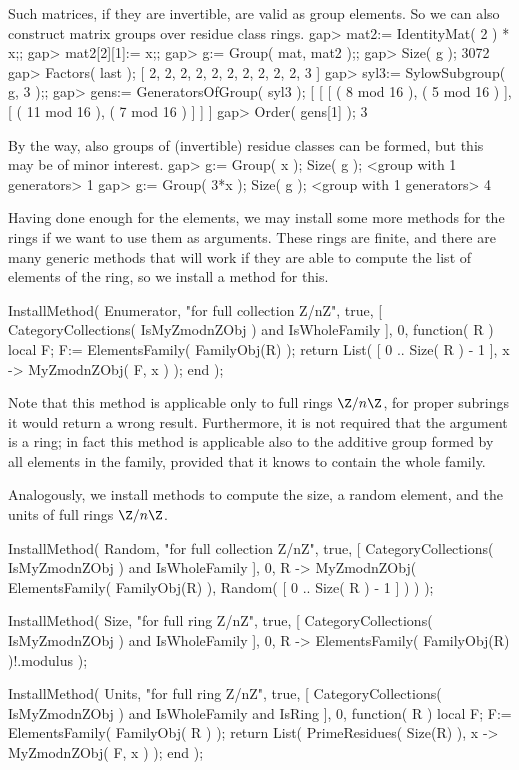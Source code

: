 Such matrices, if they are invertible, are valid as group elements.
So we can also construct matrix groups over residue class rings.
\begintt
gap> mat2:= IdentityMat( 2 ) * x;;
gap> mat2[2][1]:= x;;
gap> g:= Group( mat, mat2 );;
gap> Size( g );
3072
gap> Factors( last );
[ 2, 2, 2, 2, 2, 2, 2, 2, 2, 2, 3 ]
gap> syl3:= SylowSubgroup( g, 3 );;
gap> gens:= GeneratorsOfGroup( syl3 );
[ [ [ ( 8 mod 16 ), ( 5 mod 16 ) ], [ ( 11 mod 16 ), ( 7 mod 16 ) ] ] ]
gap> Order( gens[1] );
3
\endtt

By the way, also groups of (invertible) residue classes can be formed,
but this may be of minor interest.
\begintt
gap> g:= Group( x );  Size( g );
<group with 1 generators>
1
gap> g:= Group( 3*x );  Size( g );
<group with 1 generators>
4
\endtt

Having done enough for the elements,
we may install some more methods for the rings
if we want to use them as arguments.
These rings are finite,
and there are many generic methods that will work if they are able
to compute the list of elements of the ring,
so we install a method for this.

\begintt
InstallMethod( Enumerator,
    "for full collection Z/nZ",
    true,
    [ CategoryCollections( IsMyZmodnZObj ) and IsWholeFamily ], 0,
    function( R )
    local F;
    F:= ElementsFamily( FamilyObj(R) );
    return List( [ 0 .. Size( R ) - 1 ], x -> MyZmodnZObj( F, x ) );
    end );
\endtt

Note that this method is applicable only to full rings $\Z/n\Z$,
for proper subrings it would return a wrong result.
Furthermore, it is not required that the argument is a ring;
in fact this method is applicable also to the additive group
formed by all elements in the family,
provided that it knows to contain the whole family.

Analogously, we install methods to compute the size,
a random element, and the units of full rings $\Z/n\Z$.

\begintt
InstallMethod( Random,
    "for full collection Z/nZ",
    true,
    [ CategoryCollections( IsMyZmodnZObj ) and IsWholeFamily ], 0,
    R -> MyZmodnZObj( ElementsFamily( FamilyObj(R) ),
                    Random( [ 0 .. Size( R ) - 1 ] ) ) );

InstallMethod( Size,
    "for full ring Z/nZ",
    true,
    [ CategoryCollections( IsMyZmodnZObj ) and IsWholeFamily ], 0,
    R -> ElementsFamily( FamilyObj(R) )!.modulus );

InstallMethod( Units,
    "for full ring Z/nZ",
    true,
    [     CategoryCollections( IsMyZmodnZObj )
      and IsWholeFamily and IsRing ], 0,
    function( R )
    local F;
    F:= ElementsFamily( FamilyObj( R ) );
    return List( PrimeResidues( Size(R) ), x -> MyZmodnZObj( F, x ) );
    end );
\endtt

